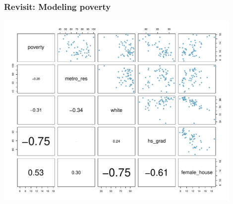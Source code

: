 \begin{frame}
\frametitle{Revisit: Modeling poverty}

\vspace{-0.75cm}

\begin{center}
\includegraphics[width=0.9\textwidth]{8-1_intro_mlr/figures/poverty/poverty}
\end{center}

\end{frame}


